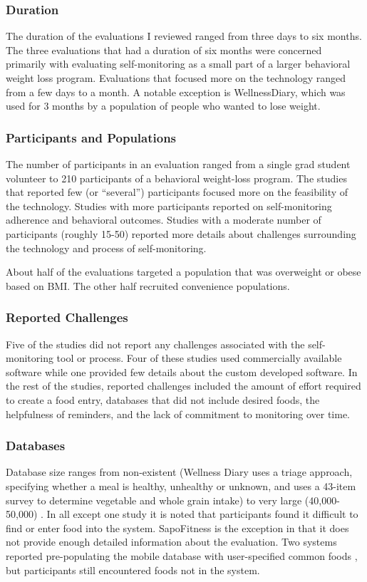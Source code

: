 \subsubsection{Duration}
The duration of the evaluations I reviewed ranged from three days to six months. The three evaluations that had a duration of six months were concerned primarily with evaluating self-monitoring as a small part of a larger behavioral weight loss program. Evaluations that focused more on the technology ranged from a few days to a month. A notable exception is WellnessDiary, which was used for 3 months by a population of people who wanted to lose weight. 

\subsubsection{Participants and Populations}
The number of participants in an evaluation ranged from a single grad student volunteer to 210 participants of a behavioral weight-loss program. The studies that reported few (or ``several'') participants focused more on the feasibility of the technology. Studies with more participants reported on self-monitoring adherence and behavioral outcomes. Studies with a moderate number of participants (roughly 15-50) reported more details about challenges surrounding the technology and process of self-monitoring. 

About half of the evaluations targeted a population that was overweight or obese based on BMI. The other half recruited convenience populations. 

\subsubsection{Reported Challenges}
Five of the studies did not report any challenges associated with the self-monitoring tool or process. Four of these studies used commercially available software while one provided few details about the custom developed software. In the rest of the studies, reported challenges included the amount of effort required to create a food entry, databases that did not include desired foods, the helpfulness of reminders, and the lack of commitment to monitoring over time. 

\subsubsection{Databases}
Database size ranges from non-existent (Wellness Diary \citep{mattila_mobile_2008} uses a triage approach, specifying whether a meal is healthy, unhealthy or unknown, and \citep{atienza_using_2008} uses a 43-item survey to determine vegetable and whole grain intake) to very large (40,000-50,000) \citep{yon_personal_2007}. In all except one study it is noted that participants found it difficult to find or enter food into the system. SapoFitness \citep{silva_sapofitness:_2011} is the exception in that it does not provide enough detailed information about the evaluation.  Two systems reported pre-populating the mobile database with user-specified common foods \citep{tsai_usability_2007,glanz_improving_2006}, but participants still encountered foods not in the system. 

